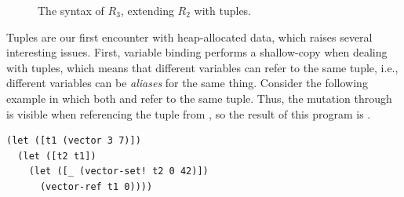 \documentclass[11pt]{book}
\newcommand{\gray}[1]{{\color{lightgray} #1}}
\begin{document}
\begin{figure}[tbp]
\centering
\fbox{
\begin{minipage}{0.96\textwidth}
\[
\begin{array}{lcl}
  \Type &::=& \gray{\key{Integer} \mid \key{Boolean}}
  \mid (\key{Vector}\;\Type^{+}) \mid \key{Void}\\
  \itm{cmp} &::= & \gray{  \key{eq?} \mid \key{<} \mid \key{<=} \mid \key{>} \mid \key{>=}  } \\
  \Exp &::=& \gray{  \Int \mid (\key{read}) \mid (\key{-}\;\Exp) \mid (\key{+} \; \Exp\;\Exp)  }  \\
  &\mid&  \gray{  \Var \mid \LET{\Var}{\Exp}{\Exp}  }\\
  &\mid& \gray{  \key{\#t} \mid \key{\#f}
    \mid (\key{and}\;\Exp\;\Exp) \mid (\key{not}\;\Exp)  }\\
  &\mid& \gray{  (\itm{cmp}\;\Exp\;\Exp) \mid \IF{\Exp}{\Exp}{\Exp}  } \\
  &\mid& (\key{vector}\;\Exp^{+}) \mid
    (\key{vector-ref}\;\Exp\;\Int) \\
  &\mid& (\key{vector-set!}\;\Exp\;\Int\;\Exp)\\
  &\mid& (\key{void}) \\
  R_3 &::=& (\key{program} \; \Exp)
\end{array}
\]
\end{minipage}
}
\caption{The syntax of $R_3$, extending $R_2$ with tuples.}
\label{fig:r3-syntax}
\end{figure}


Tuples are our first encounter with heap-allocated data, which raises
several interesting issues. First, variable binding performs a
shallow-copy when dealing with tuples, which means that different
variables can refer to the same tuple, i.e., different variables can
be \emph{aliases} for the same thing. Consider the following example
in which both  and  refer to the same tuple.  Thus,
the mutation through  is visible when referencing the tuple
from , so the result of this program is .
\begin{lstlisting}
(let ([t1 (vector 3 7)])
  (let ([t2 t1])
    (let ([_ (vector-set! t2 0 42)])
      (vector-ref t1 0))))
\end{lstlisting}
\end{document}
